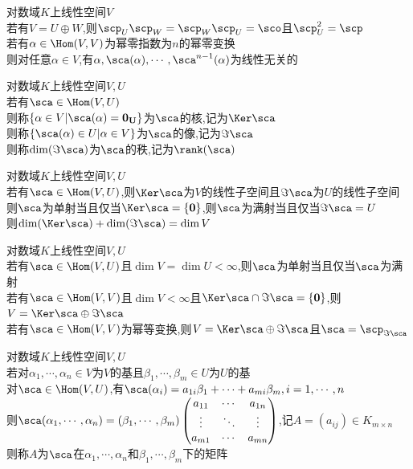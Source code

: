 \begin{dingli}
对数域$K$上线性空间$V$\\
若有$V=U\oplus W$,则$\scp_{U}\scp_{W}=\scp_{W}\scp_{U}=\sco$且$\scp_{U}^2=\scp$\\
若有$\alpha\in \Hom(V,V)$为幂零指数为$n$的幂零变换\\
则对任意$\alpha\in V$,有$\alpha,\sca(\alpha),\cdots,\sca^{n-1}(\alpha)$为线性无关的
\end{dingli}

\begin{dingyi}
对数域$K$上线性空间$V,U$\\
若有$\sca\in \Hom(V,U)$\\
则称$\{\alpha\in V|\sca(\alpha)={\bf0_{U}}\}$为$\sca$的核,记为$\Ker\sca$\\
则称$\{\sca(\alpha)\in U|\alpha\in V\}$为$\sca$的像,记为$\Im\sca$\\
则称$\dim(\Im\sca)$为$\sca$的秩,记为$\rank(\sca)$
\end{dingyi}

\begin{dingli}
对数域$K$上线性空间$V,U$\\
若有$\sca\in \Hom(V,U)$,则$\Ker\sca$为$V$的线性子空间且$\Im\sca$为$U$的线性子空间\\
则$\sca$为单射当且仅当$\Ker\sca=\{\bf0\}$,则$\sca$为满射当且仅当$\Im\sca=U$\\
则$\dim(\Ker\sca)+\dim(\Im\sca)=\dim V$
\end{dingli}

\begin{dingli}
对数域$K$上线性空间$V,U$\\
若有$\sca\in \Hom(V,U)$且$\dim V=\dim U<\infty$,则$\sca$为单射当且仅当$\sca$为满射\\
若有$\sca\in \Hom(V,V)$且$\dim V<\infty$且$\Ker\sca\cap\Im\sca=\{\bf0\}$,则$V=\Ker\sca\oplus\Im\sca$\\
若有$\sca\in \Hom(V,V)$为幂等变换,则$V=\Ker\sca\oplus\Im\sca$且$\sca=\scp_{\Im\sca}$
\end{dingli}

\begin{dingyi}
对数域$K$上线性空间$V,U$\\
若对$\alpha_1,\cdots,\alpha_n\in V$为$V$的基且$\beta_1,\cdots,\beta_m\in U$为$U$的基\\
对$\sca\in \Hom(V,U)$,有$\sca(\alpha_i)=a_{1i}\beta_1+\cdots+a_{mi}\beta_m,i=1,\cdots,n$\\
则$\sca(\alpha_1,\cdots,\alpha_n)=(\beta_1,\cdots,\beta_m)\begin{pmatrix}a_{11}&\cdots&a_{1n}\\ \vdots&\ddots&\vdots\\ a_{m1}&\cdots&a_{mn}\end{pmatrix}$,记$A=(a_{ij})\in K_{m\times n}$\\
则称$A$为$\sca$在$\alpha_1,\cdots,\alpha_n$和$\beta_1,\cdots,\beta_m$下的矩阵
\end{dingyi}

